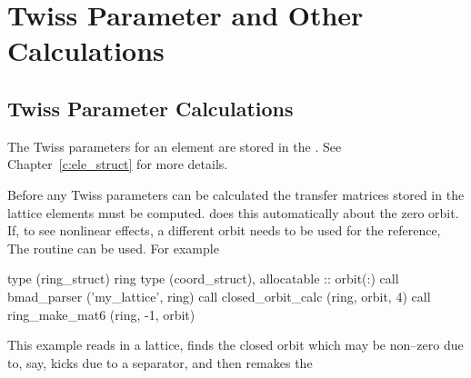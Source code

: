 \chapter{Twiss Parameter and Other Calculations}
\label{c:twiss}

\section{Twiss Parameter Calculations}
\label{s:twiss}

The Twiss parameters for an element are stored in the
. See Chapter~\ref{c:ele_struct} for more details.

Before any Twiss parameters can be calculated the transfer matrices
stored in the lattice elements must be computed.  does
this automatically about the zero orbit. If, to see nonlinear effects,
a different orbit needs to be used for the reference, The routine
 can be used. For example
\begin{example}
  type (ring_struct) ring
  type (coord_struct), allocatable :: orbit(:)
  call bmad_parser ('my_lattice', ring)
  call closed_orbit_calc (ring, orbit, 4)
  call ring_make_mat6 (ring, -1, orbit)
\end{example}
This example reads in a lattice, finds the closed orbit which may be
non--zero due to, say, kicks due to a separator, and then remakes the
